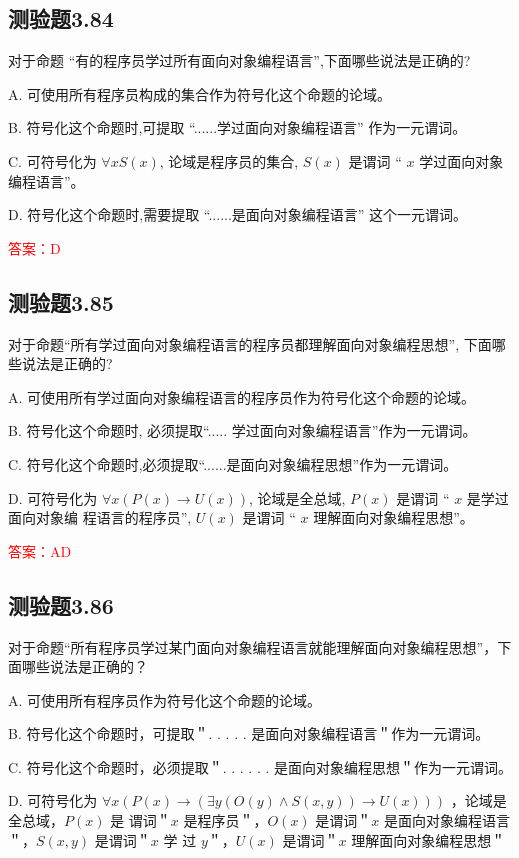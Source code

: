 \documentclass[UTF8, heading=true]{ctexart}
\begin{document}
\subsection{测验题3.84}

对于命题 “有的程序员学过所有面向对象编程语言”,下面哪些说法是正确的?

A. 可使用所有程序员构成的集合作为符号化这个命题的论域。

B. 符号化这个命题时,可提取 “......学过面向对象编程语言” 作为一元谓词。

C. 可符号化为 $\forall x S(x)$, 论域是程序员的集合, $S(x)$ 是谓词 “ $x$ 学过面向对象编程语言”。

D. 符号化这个命题时,需要提取 “......是面向对象编程语言” 这个一元谓词。

\textcolor{red}{答案：D}

\subsection{测验题3.85}

对于命题“所有学过面向对象编程语言的程序员都理解面向对象编程思想”, 下面哪些说法是正确的?

A. 可使用所有学过面向对象编程语言的程序员作为符号化这个命题的论域。

B. 符号化这个命题时, 必须提取“..... 学过面向对象编程语言”作为一元谓词。

C. 符号化这个命题时,必须提取“......是面向对象编程思想”作为一元谓词。

D. 可符号化为 $\forall x(P(x) \rightarrow U(x))$, 论域是全总域, $P(x)$ 是谓词 “ $x$ 是学过面向对象编
程语言的程序员”, $U(x)$ 是谓词 “ $x$ 理解面向对象编程思想”。

\textcolor{red}{答案：AD}

\subsection{测验题3.86}

对于命题“所有程序员学过某门面向对象编程语言就能理解面向对象编程思想”，下面哪些说法是正确的？

A. 
可使用所有程序员作为符号化这个命题的论域。

B. 
符号化这个命题时，可提取＂. . . . . 是面向对象编程语言＂作为一元谓词。

C. 
符号化这个命题时，必须提取＂. . . . . . 是面向对象编程思想＂作为一元谓词。

D. 
可符号化为 $\forall x(P(x) \rightarrow(\exists y(O(y) \wedge S(x, y)) \rightarrow U(x)))$ ，论域是全总域，$P(x)$ 是
谓词＂$x$ 是程序员＂，$O(x)$ 是谓词＂$x$ 是面向对象编程语言＂，$S(x, y)$ 是谓词＂$x$ 学
过 $y$＂，$U(x)$ 是谓词＂$x$ 理解面向对象编程思想＂
\end{document}

